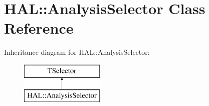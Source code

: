 \hypertarget{class_h_a_l_1_1_analysis_selector}{\section{H\-A\-L\-:\-:Analysis\-Selector Class Reference}
\label{class_h_a_l_1_1_analysis_selector}
}
Inheritance diagram for H\-A\-L\-:\-:Analysis\-Selector\-:\begin{figure}[H]
\begin{center}
\leavevmode
\includegraphics[height=2.000000cm]{class_h_a_l_1_1_analysis_selector}
\end{center}
\end{figure}
